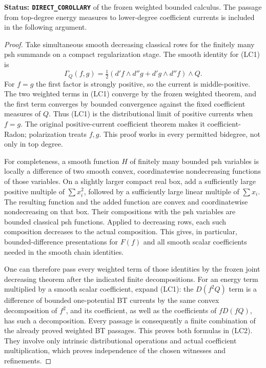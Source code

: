 \noindent\textbf{Status: \texttt{DIRECT\_COROLLARY}} of the
frozen weighted bounded calculus.  The passage from top-degree
energy measures to lower-degree coefficient currents is included
in the following argument.

\begin{proof}
Take simultaneous smooth decreasing classical rows for the finitely
many psh summands on a compact regularization stage.  The smooth
identity for (LC1) is
\[
 \Gamma_Q(f,g)
 =\tfrac12(d'f\wedge d''g+d'g\wedge d''f)\wedge Q.
\]
For $f=g$ the first factor is strongly positive, so the current is
middle-positive.  The two weighted terms in (LC1) converge by the
frozen weighted theorem, and the first term converges by bounded
convergence against the fixed coefficient measures of $Q$.
Thus (LC1) is the distributional limit of positive currents when
$f=g$.  The original positive-current coefficient theorem makes
it coefficient-Radon; polarization treats $f,g$.  This proof works
in every permitted bidegree, not only in top degree.

For completeness, a smooth function $H$ of finitely many bounded
psh variables is locally a difference of two smooth convex,
coordinatewise nondecreasing functions of those variables.  On a
slightly larger compact real box, add a sufficiently large positive
multiple of $\sum x_i^2$, followed by a sufficiently large linear
multiple of $\sum x_i$.  The resulting function and the added
function are convex and coordinatewise nondecreasing on that box.
Their compositions with the psh variables are bounded classical
psh functions.  Applied to decreasing rows, each such composition
decreases to the actual composition.  This gives, in particular,
bounded-difference presentations for $F(f)$ and all smooth scalar
coefficients needed in the smooth chain identities.

One can therefore pass every weighted term of those identities by
the frozen joint decreasing theorem after the indicated finite
decompositions.  For an energy term multiplied by a smooth scalar
coefficient, expand (LC1): the $D(f^2Q)$ term is a difference of
bounded one-potential BT currents by the same convex decomposition
of $f^2$, and its coefficient, as well as the coefficients of
$fD(fQ)$, has such a decomposition.  Every passage is consequently
a finite combination of the already proved weighted BT passages.
This proves both formulas in (LC2).  They involve only intrinsic
distributional operations and actual coefficient multiplication,
which proves independence of the chosen witnesses and refinements.
\end{proof}

